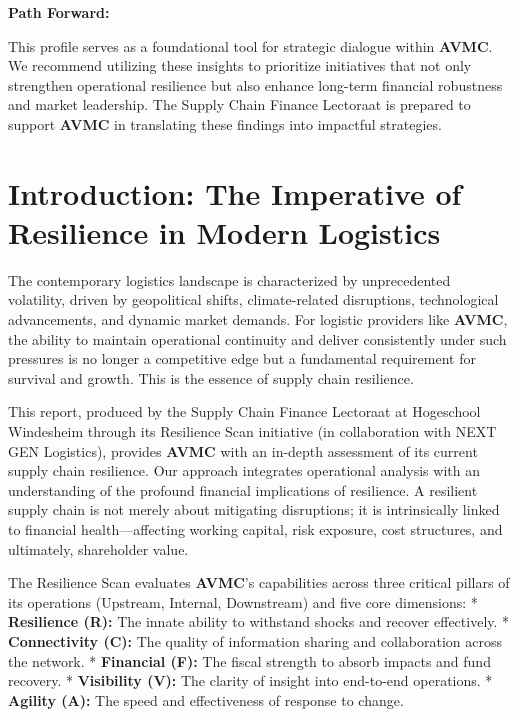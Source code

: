 \documentclass[
  oneside,
  open=any,
  fontsize=11pt]{scrbook}
\begin{document}
\textbf{Path Forward:}

This profile serves as a foundational tool for strategic dialogue within
\textbf{AVMC}. We recommend utilizing these insights to prioritize
initiatives that not only strengthen operational resilience but also
enhance long-term financial robustness and market leadership. The Supply
Chain Finance Lectoraat is prepared to support \textbf{AVMC} in
translating these findings into impactful strategies.

\newpage

\chapter{Introduction: The Imperative of Resilience in Modern
Logistics}\label{introduction-the-imperative-of-resilience-in-modern-logistics}

The contemporary logistics landscape is characterized by unprecedented
volatility, driven by geopolitical shifts, climate-related disruptions,
technological advancements, and dynamic market demands. For logistic
providers like \textbf{AVMC}, the ability to maintain operational
continuity and deliver consistently under such pressures is no longer a
competitive edge but a fundamental requirement for survival and growth.
This is the essence of supply chain resilience.

This report, produced by the Supply Chain Finance Lectoraat at
Hogeschool Windesheim through its Resilience Scan initiative (in
collaboration with NEXT GEN Logistics), provides \textbf{AVMC} with an
in-depth assessment of its current supply chain resilience. Our approach
integrates operational analysis with an understanding of the profound
financial implications of resilience. A resilient supply chain is not
merely about mitigating disruptions; it is intrinsically linked to
financial health---affecting working capital, risk exposure, cost
structures, and ultimately, shareholder value.

The Resilience Scan evaluates \textbf{AVMC}'s capabilities across three
critical pillars of its operations (Upstream, Internal, Downstream) and
five core dimensions: * \textbf{Resilience (R):} The innate ability to
withstand shocks and recover effectively. * \textbf{Connectivity (C):}
The quality of information sharing and collaboration across the network.
* \textbf{Financial (F):} The fiscal strength to absorb impacts and fund
recovery. * \textbf{Visibility (V):} The clarity of insight into
end-to-end operations. * \textbf{Agility (A):} The speed and
effectiveness of response to change.
\end{document}
